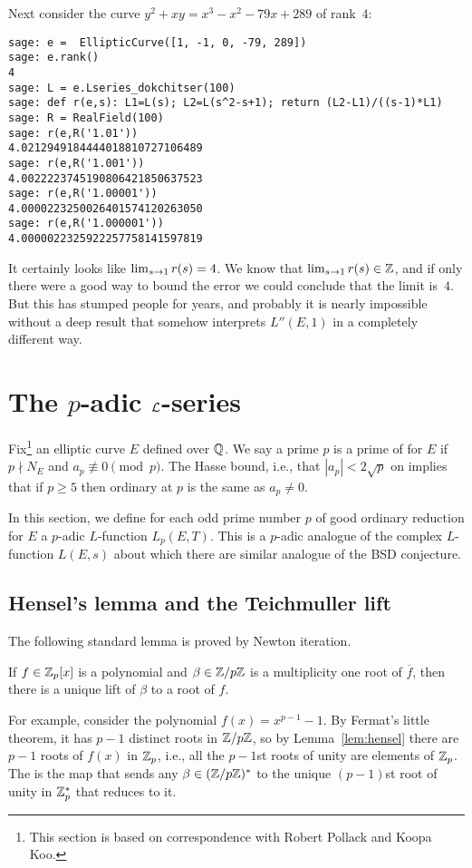Next consider the curve $y^2 +xy = x^3 - x^2 - 79x + 289$
of rank~$4$:
\begin{verbatim}
sage: e =  EllipticCurve([1, -1, 0, -79, 289])
sage: e.rank()
4
sage: L = e.Lseries_dokchitser(100)
sage: def r(e,s): L1=L(s); L2=L(s^2-s+1); return (L2-L1)/((s-1)*L1)
sage: R = RealField(100)
sage: r(e,R('1.01'))
4.0212949184444018810727106489
sage: r(e,R('1.001'))
4.0022223745190806421850637523
sage: r(e,R('1.00001'))
4.0000223250026401574120263050
sage: r(e,R('1.000001'))
4.0000022325922257758141597819
\end{verbatim}

It certainly looks like $\lim_{s\rightarrow 1} r(s) = 4$.  We know that
$\lim_{s\rightarrow 1} r(s)\in\mathbb{Z}$, and if only there were a good way to bound
the error we could conclude that the limit is~$4$.  But this has
stumped people for years, and probably it is nearly impossible without
a deep result that somehow interprets $L''(E,1)$ in a completely
different way.

\newpage
\section{The $p$-adic $\mathcal{L}$-series}\label{sec:padicldefn}
Fix\footnote{This section is based on correspondence with Robert
  Pollack and Koopa Koo.} an elliptic curve $E$ defined over $\mathbb{Q}$.
We say a prime $p$ is a prime of  for
$E$ if $p\nmid N_E$ and $a_p \not\equiv 0 \pmod{p}$.  The Hasse bound,
i.e., that $|a_p|< 2\sqrt{p}$ on implies that if $p\geq 5$ then
ordinary at $p$ is the same as $a_p\neq 0$.

In this section, we define for each odd prime number $p$ of good
ordinary reduction for $E$ a $p$-adic $L$-function $L_p(E,T)$.  This
is a $p$-adic analogue of the complex $L$-function 
$L(E,s)$ about which there are similar analogue of the
BSD conjecture.

\subsection{Hensel's lemma and the Teichmuller lift}\label{sec:padicprelim}
The following standard lemma is proved by Newton iteration.
\begin{lemma}[Hensel]\label{lem:hensel}
If $f \in \mathbb{Z}_p[x]$ is a polynomial and $\beta \in \mathbb{Z}/p\mathbb{Z}$
is a multiplicity one root of $\overline{f}$, then there is a unique
lift of $\beta$ to a root of $f$.
\end{lemma}%
For example, consider the polynomial $f(x) = x^{p-1} - 1$.  By
Fermat's little theorem, it has $p-1$ distinct roots in $\mathbb{Z}/p\mathbb{Z}$,
so by Lemma~\ref{lem:hensel} there are $p-1$ roots of $f(x)$
in $\mathbb{Z}_p$, i.e., all the $p-1$st roots of unity are elements of
$\mathbb{Z}_p$.  The  is the map that sends
any $\beta \in (\mathbb{Z}/p\mathbb{Z})^*$ to the unique $(p-1)$st root of unity
in $\mathbb{Z}_p^*$ that reduces to it. 

